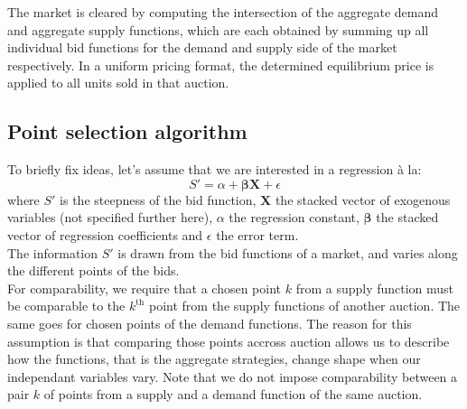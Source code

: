 The market is cleared by computing the intersection of the aggregate demand and aggregate supply functions, which are each obtained by summing up all individual bid functions for the demand and supply side of the market respectively. In a uniform pricing format, the determined equilibrium price is applied to all units sold in that auction.


\subsection{Point selection algorithm}\label{pointselect}

To briefly fix ideas, let's assume that we are interested in a regression \`{a} la: 
$$ S' = \alpha + \boldsymbol{\beta  X} + \epsilon$$
where $S'$ is the steepness of the bid function, $\boldsymbol{X}$ the stacked vector of exogenous variables (not specified further here), $\alpha$ the regression constant, $\boldsymbol{\beta}$ the stacked vector of regression coefficients and $\epsilon$ the error term. \\

The information $S'$ is drawn from the bid functions of a %
market, and varies along the different points of the bids.\\

For comparability, we require that a chosen point $k$ from a supply function must be comparable to the $k^\text{th}$ point from the supply functions of another auction. The same goes for chosen points of the demand functions. The reason for this assumption is that comparing those points accross auction allows us to describe how the functions, that is the aggregate strategies, change shape when our independant variables vary. Note that we do not impose comparability between a pair $k$ of points from a supply and a demand function of the same auction. 

 
